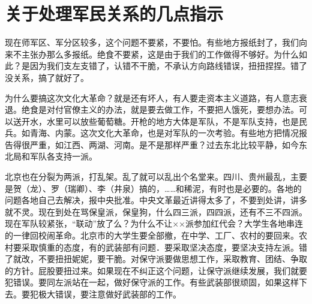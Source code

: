 \section[关于处理军民关系的几点指示（一九六七年五月）]{关于处理军民关系的几点指示}


现在师军区、军分区较多，这个问题不要紧，不要怕。有些地方报纸封了，我们向来不主张办那么多报纸。绝食不要紧，这是由于我们的工作做得不够好。为什么如此？是因为我们支左支错了，认错不干脆，不承认方向路线错误，扭扭捏捏。错了没关系，搞了就好了。

为什么要搞这次文化大革命？就是还有坏人，有人要走资本主义道路，有人意志衰退。绝食是对付官僚主义的办法，就是要去做工作，不要把人饿死，要想办法。可以送开水，水里可以放些葡萄糖。开枪的地方大体是军队，不是军队支持，也是民兵。如青海、内蒙。这次文化大革命，也是对军队的一次考验。有些地方把情况报告得很严重，如江西、两湖、河南。是不是那样严重？过去东北比较平静，如今东北局和军队各支持一派。

北京也在分裂为两派，打乱架。乱了就可以乱出个名堂来。四川、贵州最乱，主要是贺（龙）、罗（瑞卿）、李（井泉）搞的，……和稀泥，有时也是必要的。各地的问题各地自己去解决，报中央批准。中央文革最近讲得太多了，不要到处讲，讲多就不灵。现在到处在骂保皇派，保皇狗，什么四三派，四四派，还有不三不四派。现在军队较紧张，“联动”放了么？为什么不让××派参加红代会？大学生各地串连的一律回校闹革命。北京市的大学生要全部撤，在中学、工厂、农村的要回来。农村要采取慎重的态度，有的武装部有问题．要采取坚决态度，要坚决支持左派。错了就改，不要扭扭妮妮，要干脆。对保守派要做思想工作，采取教育、团结、争取的方针。屁股要扭过来。如果现在不纠正这个问题，让保守派继续发展，我们就要犯错误。要同左派站在一起，做好保守派的工作。有些武装部很顽固，如果这样下去。要犯极大错误，要注意做好武装部的工作。

